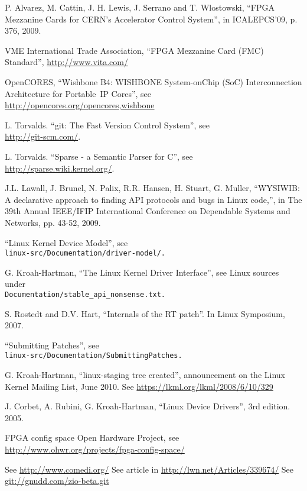 \documentclass{JAC2003}
\begin{document}
\begin{thebibliography}{99} %

P. Alvarez, M. Cattin, J. H. Lewis, J. Serrano and T. Wlostowski,
``FPGA Mezzanine Cards for CERN’s Accelerator Control System'',
in ICALEPCS'09, p. 376, 2009.

VME International Trade Association,
``FPGA Mezzanine Card (FMC) Standard'', \url{http://www.vita.com/}

OpenCORES,
``Wishbone B4: WISHBONE System-on\-{}{}Chip (SoC) Interconnection
Architecture for Portable~IP Cores'', see\\
\url{http://opencores.org/opencores,wishbone}

L. Torvalds. ``git: The Fast Version Control System'', see\\
\url{http://git-scm.com/}.

L. Torvalds. ``Sparse - a Semantic Parser for C'', see\\
\url{http://sparse.wiki.kernel.org/}.

J.L. Lawall, J. Brunel, N. Palix, R.R. Hansen, H. Stuart, G. Muller,
``WYSIWIB: A declarative approach to finding API protocols and bugs in
Linux code,'', in The 39th Annual IEEE/IFIP International Conference on
Dependable Systems and Networks, pp. 43-52, 2009.

``Linux Kernel Device Model'', see\\
\texttt{linux-src/Documentation/driver-model/.}

G. Kroah-Hartman, ``The Linux Kernel Driver Interface'', see Linux
sources under\\
\texttt{Documentation/stable\_api\_nonsense.txt.}

S. Rostedt and D.V. Hart, ``Internals of the RT patch''. In Linux
Symposium, 2007.

``Submitting Patches'', see\\
\texttt{linux-src/Documentation/SubmittingPatches.}

G. Kroah-Hartman, ``linux-staging tree created'', announcement on the
Linux Kernel Mailing List, June 2010.
See \url{https://lkml.org/lkml/2008/6/10/329}

J. Corbet, A. Rubini, G. Kroah-Hartman, ``Linux Device Drivers'', 3rd
edition. 2005.

 FPGA config space Open Hardware
Project, see
\url{http://www.ohwr.org/projects/fpga-config-space/}

 See \url{http://www.comedi.org/}
 See article in \url{http://lwn.net/Articles/339674/}
 See \url{git://gnudd.com/zio-beta.git}

\end{thebibliography}
\end{document}
